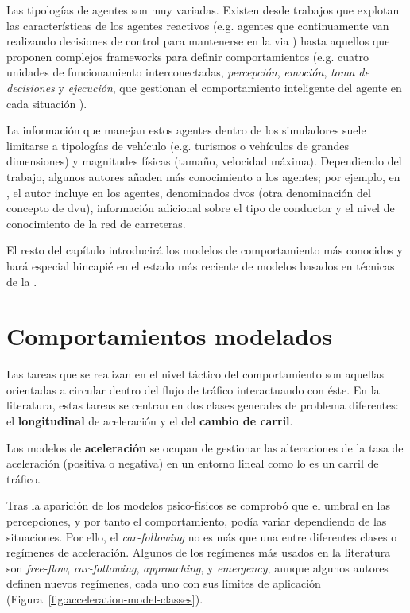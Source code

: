 Las tipologías de agentes son muy variadas. Existen desde trabajos que explotan las características de los agentes reactivos (e.g. agentes que continuamente van realizando decisiones de control para mantenerse en la via \cite{Ehlert2001}) hasta aquellos que proponen complejos frameworks para definir comportamientos (e.g. cuatro unidades de funcionamiento interconectadas, \textit{percepción}, \textit{emoción}, \textit{toma de decisiones} y \textit{ejecución}, que gestionan el comportamiento inteligente del agente en cada situación \cite{al2001framework}).

La información que manejan estos agentes dentro de los simuladores suele limitarse a tipologías de vehículo (e.g. turismos o vehículos de grandes dimensiones) y magnitudes físicas (tamaño, velocidad máxima). Dependiendo del trabajo, algunos autores añaden más conocimiento a los agentes; por ejemplo, en \cite{hidas2002modelling}, el autor incluye en los agentes, denominados \glspl{dvo} (otra denominación del concepto de \gls{dvu}), información adicional sobre el tipo de conductor y el nivel de conocimiento de la red de carreteras.

El resto del capítulo introducirá los modelos de comportamiento más conocidos y hará especial hincapié en el estado más reciente de modelos basados en técnicas de la .

\section{Comportamientos modelados}

Las tareas que se realizan en el nivel táctico del comportamiento son aquellas orientadas a circular dentro del flujo de tráfico interactuando con éste. En la literatura, estas tareas se centran en dos clases generales de problema diferentes: el \textbf{longitudinal} de aceleración y el del \textbf{cambio de carril}.

Los modelos de \textbf{aceleración} se ocupan de gestionar las alteraciones de la tasa de aceleración (positiva o negativa) en un entorno lineal como lo es un carril de tráfico.

Tras la aparición de los modelos psico-físicos se comprobó que el umbral en las percepciones, y por tanto el comportamiento, podía variar dependiendo de las situaciones. Por ello, el \textit{\gls{car-following}} no es más que una entre diferentes clases o regímenes de aceleración. Algunos de los regímenes más usados en la literatura son \textit{free-flow}, \textit{\gls{car-following}}, \textit{approaching}, y \textit{emergency}, aunque algunos autores definen nuevos regímenes, cada uno con sus límites de aplicación (Figura~\ref{fig:acceleration-model-classes}).

